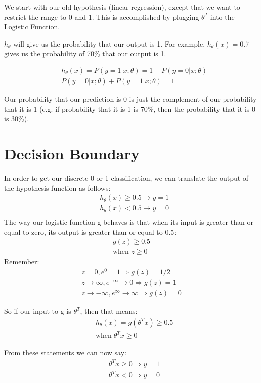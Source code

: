 We start with our old hypothesis (linear regression), except that we want to restrict the range to 0 and 1. This is accomplished by plugging $\theta^T $ into the Logistic Function.

$h_\theta $ will give us the probability that our output is 1. For example, $h_\theta(x)=0.7$ gives us the probability of 70\% that our output is 1.

\begin{align*}
&h_\theta(x) = P(y=1 | x ; \theta) = 1 - P(y=0 | x ; \theta) \\ 
&P(y = 0 | x;\theta) + P(y = 1 | x ; \theta) = 1
\end{align*}

Our probability that our prediction is 0 is just the complement of our probability that it is 1 (e.g. if probability that it is 1 is 70\%, then the probability that it is 0 is 30\%).
\section*{Decision Boundary}
In order to get our discrete 0 or 1 classification, we can translate the output of the hypothesis function as follows:
\begin{align*}
& h_\theta(x) \geq 0.5 \rightarrow y = 1 \\
& h_\theta(x) < 0.5 \rightarrow y = 0 \\
\end{align*}
The way our logistic function g behaves is that when its input is greater than or equal to zero, its output is greater than or equal to 0.5:
\begin{align*}
g(z) \geq 0.5 \\
\text{when } z \geq 0
\end{align*}
Remember:
\begin{align*}
z=0,  e^{0}=1 \Rightarrow  g(z)=1/2\\ 
z \to \infty, e^{-\infty} \to 0 \Rightarrow g(z)=1 \\ 
z \to -\infty, e^{\infty}\to \infty \Rightarrow g(z)=0 
\end{align*}

So if our input to g is $\theta^T$, then that means:
\begin{align*}
& h_\theta(x) = g(\theta^T x) \geq 0.5 \\
& \text{when} \; \theta^T x \geq 0
\end{align*}

From these statements we can now say:
\begin{align*}
& \theta^T x \geq 0 \Rightarrow y = 1 \\
& \theta^T x < 0 \Rightarrow y = 0 \\
\end{align*}

